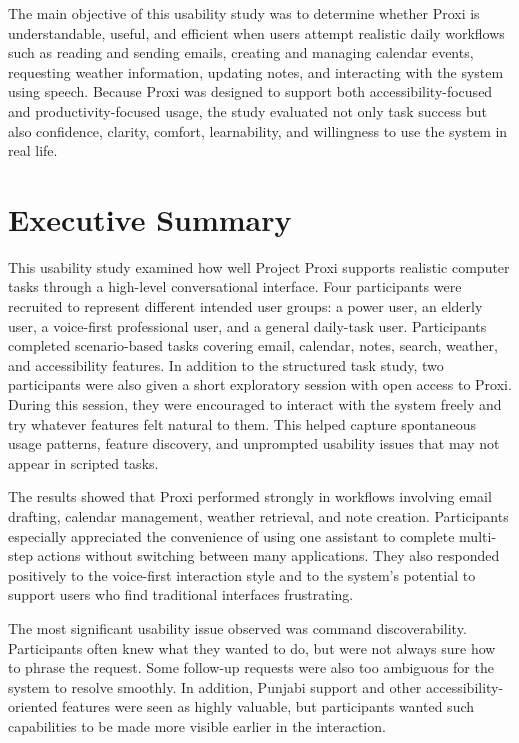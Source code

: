 \documentclass[12pt, titlepage]{article}
\begin{document}
The main objective of this usability study was to determine whether
Proxi is understandable, useful, and efficient when users attempt
realistic daily workflows such as reading and sending emails, creating
and managing calendar events, requesting weather information, updating
notes, and interacting with the system using speech. Because Proxi was
designed to support both accessibility-focused and productivity-focused
usage, the study evaluated not only task success but also confidence,
clarity, comfort, learnability, and willingness to use the system in
real life.

\section{Executive Summary}

This usability study examined how well Project Proxi supports realistic
computer tasks through a high-level conversational interface. Four
participants were recruited to represent different intended user groups:
a power user, an elderly user, a voice-first professional user, and a
general daily-task user. Participants completed scenario-based tasks
covering email, calendar, notes, search, weather, and accessibility
features. In addition to the structured task study, two participants
were also given a short exploratory session with open access to Proxi.
During this session, they were encouraged to interact with the system
freely and try whatever features felt natural to them. This helped
capture spontaneous usage patterns, feature discovery, and unprompted
usability issues that may not appear in scripted tasks.

The results showed that Proxi performed strongly in workflows involving
email drafting, calendar management, weather retrieval, and note
creation. Participants especially appreciated the convenience of using
one assistant to complete multi-step actions without switching between
many applications. They also responded positively to the voice-first
interaction style and to the system's potential to support users who
find traditional interfaces frustrating.

The most significant usability issue observed was command
discoverability. Participants often knew what they wanted to do, but
were not always sure how to phrase the request. Some follow-up requests
were also too ambiguous for the system to resolve smoothly. In addition,
Punjabi support and other accessibility-oriented features were seen as
highly valuable, but participants wanted such capabilities to be made
more visible earlier in the interaction.
\end{document}
